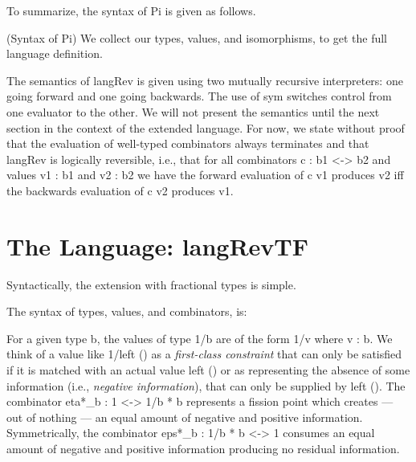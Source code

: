 \documentclass{llncs}
\begin{document}
\noindent
To summarize, the syntax of {{Pi}} is given as follows. 

\begin{definition}{(Syntax of {{Pi}})}
\label{def:Pi}
We collect our types, values, and isomorphisms, to get the full language
definition.
%
\end{definition}

The semantics of {{langRev}} is given using two mutually recursive
interpreters: one going forward and one going backwards. The use of {{sym}}
switches control from one evaluator to the other. We will not present the
semantics until the next section in the context of the extended language.
For now, we state without proof that the evaluation of well-typed combinators
always terminates and that {{langRev}} is logically reversible, i.e., that
for all combinators {{c : b1 <-> b2}} and values {{v1 : b1}} and {{v2 : b2}}
we have the forward evaluation of {{c v1}} produces {{v2}} iff the backwards
evaluation of {{c v2}} produces {{v1}}.

\section{The Language: {{langRevTF}} }

Syntactically, the extension with fractional types is simple. 

\begin{definition}
\label{def:langRevT}
The syntax of types, values, and combinators, is:
%
\end{definition}

For a given type {{b}}, the values of type {{1/b}} are of the form {{1/v}}
where {{v : b}}. We think of a value like {{1/left ()}} as a
\emph{first-class constraint} that can only be satisfied if it is matched
with an actual value {{left ()}} or as representing the absence of some
information (i.e., \emph{negative information}), that can only be supplied by
{{left ()}}. The combinator {{eta*_b : 1 <-> 1/b * b}} represents a fission
point which creates --- out of nothing --- an equal amount of negative and
positive information. Symmetrically, the combinator {{eps*_b : 1/b * b <-> 1}}
consumes an equal amount of negative and positive information producing 
no residual information.
\end{document}
